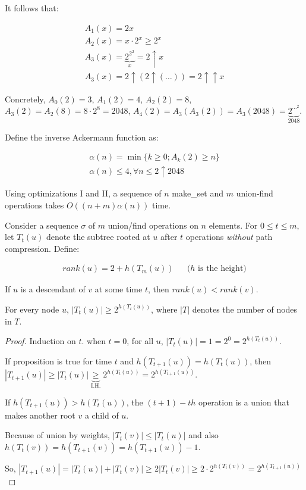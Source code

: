 It follows that:

\begin{align*}
A_1(x) = 2x \\
A_2(x) = x \cdot 2^x \ge 2^x \\
A_3(x) = \underbrace{2^{2^2}}_{x} = 2 \uparrow x \\
A_3(x) = 2 \uparrow (2 \uparrow ( \ldots ) ) = 2 \uparrow \uparrow x
\end{align*}

Concretely, $A_0(2) = 3$, $A_1(2) = 4$, $A_2(2) = 8$, $A_3(2) = A_2(8) = 8 \cdot 2^8 = 2048$, $A_4(2) = A_3(A_3(2)) = A_3(2048) = \underbrace{2^{\cdots^2}}_2048$.

Define the inverse Ackermann function as:

\begin{align*}
\alpha(n) = \min \{ k \ge 0; A_k(2) \ge n \} \\
\alpha(n) \le 4, \forall n\le 2 \uparrow 2048
\end{align*}

\begin{mytheorem}
Using optimizations I and II, a sequence of $n$ make\_set and $m$ union-find operations takes $O((n+m)\alpha(n))$ time.
\end{mytheorem}

Consider a sequence $\sigma$ of $m$ union/find operations on $n$ elements. For $0 \le t \le m$, let $T_t(u)$ denote the subtree rooted at $u$ after $t$ operations \emph{without} path compression. Define:

\begin{align*}
{rank}(u) = 2 + h(T_m(u)) && \text{($h$ is the height)}
\end{align*}

If $u$ is a descendant of $v$ at some time $t$, then ${rank}(u) < {rank}(v)$.

\begin{mylemma}
For every node $u$, $|T_t(u)| \ge 2^{h(T_t(u))}$, where $|T|$ denotes the number of nodes in $T$.
\end{mylemma}
\begin{proof}
Induction on $t$. when $t=0$, for all $u$, $|T_t(u)| = 1 = 2^0 = 2^{h(T_t(u))}$.

If proposition is true for time $t$ and $h(T_{t+1}(u)) = h(T_t(u))$, then $|T_{t+1}(u)| \ge |T_t(u)| \underbrace{\ge}_\text{I.H.} 2^{h(T_t(u))} = 2^{h(T_{t+1}(u))}$.

\bigskip If $h(T_{t+1}(u)) > h(T_t(u))$, the $(t+1)-th$ operation is a union that makes another root $v$ a child of $u$. 

Because of union by weights,  $|T_t(v)| \le |T_t(u)|$ and also $h(T_t(v)) = h(T_{t+1}(v)) = h(T_{t+1}(u))-1$.

So, $|T_{t+1}(u)| = |T_t(u)| + |T_t(v)| \ge 2 |T_t(v)| \ge 2 \cdot 2^{h(T_t(v))} = 2^{h(T_{t+1}(u))}$ 
\end{proof}

